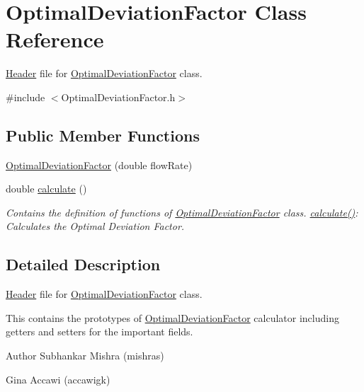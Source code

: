 \hypertarget{class_optimal_deviation_factor}{}\section{Optimal\+Deviation\+Factor Class Reference}
\label{class_optimal_deviation_factor}


\hyperlink{class_header}{Header} file for \hyperlink{class_optimal_deviation_factor}{Optimal\+Deviation\+Factor} class.  




{\ttfamily \#include $<$Optimal\+Deviation\+Factor.\+h$>$}

\subsection*{Public Member Functions}
\begin{DoxyCompactItemize}
\item 
\hyperlink{class_optimal_deviation_factor_a61e6acfd31d44bc1f2f622407ba1e857}{Optimal\+Deviation\+Factor} (double flow\+Rate)
\item 
double \hyperlink{class_optimal_deviation_factor_aaa6687bb46d275c4cbcfe44caf895a37}{calculate} ()
\begin{DoxyCompactList}\small\item\em Contains the definition of functions of \hyperlink{class_optimal_deviation_factor}{Optimal\+Deviation\+Factor} class. \hyperlink{class_optimal_deviation_factor_aaa6687bb46d275c4cbcfe44caf895a37}{calculate()}\+: Calculates the Optimal Deviation Factor. \end{DoxyCompactList}\end{DoxyCompactItemize}


\subsection{Detailed Description}
\hyperlink{class_header}{Header} file for \hyperlink{class_optimal_deviation_factor}{Optimal\+Deviation\+Factor} class. 

This contains the prototypes of \hyperlink{class_optimal_deviation_factor}{Optimal\+Deviation\+Factor} calculator including getters and setters for the important fields.

\begin{DoxyAuthor}{Author}
Subhankar Mishra (mishras) 

Gina Accawi (accawigk) 
\end{DoxyAuthor}


